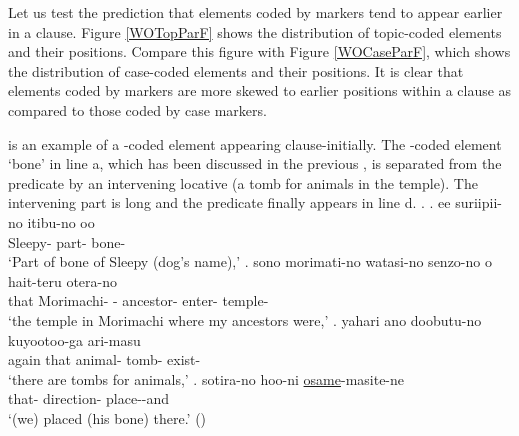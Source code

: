 Let us test the prediction that elements coded by  markers tend to appear earlier in a clause.
Figure \ref{WOTopParF} shows the distribution of topic-coded elements
and their positions.
Compare this figure with Figure \ref{WOCaseParF},
which shows the distribution of case-coded elements and their positions.
It is clear that
elements coded by  markers are more skewed to earlier positions within a clause as compared to those coded by case markers.

\Next is an example of a -coded element appearing clause-initially.
The -coded element  `bone' in line a,
which has been discussed in the previous ,
is separated from the predicate by an intervening locative (a tomb for animals in the temple).
The intervening part is long and the predicate finally appears in line d.
%
\ex.
	\ag. ee suriipii-no itibu-no oo  \\
		 Sleepy- part-  bone- \\
		`Part of bone of Sleepy (dog's name),'
	\bg. sono morimati-no watasi-no senzo-no o hait-teru otera-no \\
		that Morimachi- - ancestor-  enter- temple- \\
		`the temple in Morimachi where my ancestors were,'
	\bg. yahari ano doobutu-no kuyootoo-ga ari-masu \\
		again that animal- tomb- exist- \\
		`there are tombs for animals,'
	\bg. sotira-no hoo-ni \ul{osame}-masite-ne \\
		that- direction- place--and \\
		`(we) placed (his bone) there.'
	\hfill{()}


